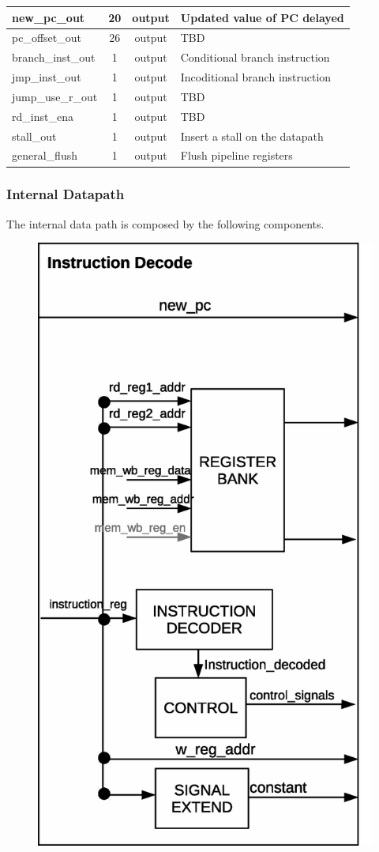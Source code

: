 \documentclass{article}
\begin{document}
\begin{center}
\begin{longtable}[pos]{| l | c | c | m{7cm} |}
        new\_pc\_out            & 20  & output  & Updated value of PC delayed  \\ \hline
        pc\_offset\_out         & 26  & output  & TBD  \\ \hline
        branch\_inst\_out       & 1   & output  & Conditional branch instruction  \\ \hline
        jmp\_inst\_out          & 1   & output  & Incoditional branch instruction  \\ \hline
        jump\_use\_r\_out       & 1   & output  & TBD  \\ \hline  
        rd\_inst\_ena           & 1   & output  & TBD  \\ \hline  
        stall\_out              & 1   & output  & Insert a stall on the datapath  \\ \hline  
        general\_flush          & 1   & output  & Flush pipeline registers  \\ \hline  
      \end{longtable}
    \end{center}

  \newpage
  \subsubsection{Internal Datapath} 
  The internal data path is composed by the following components.

  \begin{figure}[H]
    \centering
    \includegraphics[width=0.45\linewidth]{pictures/datapath/id_datapath.eps}
  \end{figure} 
  
\end{document}
